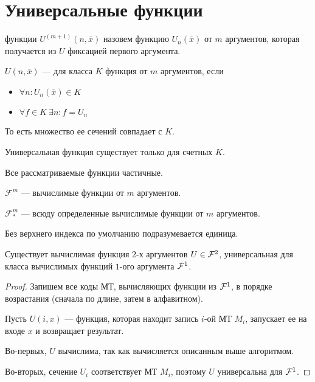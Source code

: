 \section{Универсальные функции}
\begin{defn}
	 функции $ U^{(m+1)}(n, \overline{x})$ назовем функцию $ U_n(\overline{x})$ от $ m$ аргументов, которая получается из $ U$ фиксацией первого аргумента.
\end{defn}
\begin{defn}
$ U(n, \overline{x})$ ---  для класса $ K$ функция от $ m$ аргументов, если 
	\begin{itemize}
		\item $ \forall n \colon  U_n(\overline{x}) \in K$
		\item $ \forall f \in K ~ \exists n \colon f = U_{n}$
	\end{itemize}
	То есть множество ее сечений совпадает с $ K$.
\end{defn}

\begin{note}
    Универсальная функция существует только для счетных $ K$.
\end{note}
\begin{note}
    Все рассматриваемые функции частичные.
\end{note}
\begin{name}
	$ \mathcal{F}^{m}$ --- вычислимые функции от $  m$ аргументов.

	$ \mathcal{F}^{m}_{*}$ --- всюду определенные вычислимые функции от $  m$ аргументов. 

	Без верхнего индекса по умолчанию подразумевается единица.
\end{name}

\begin{thm}\label{thm:two-args}
    Существует вычислимая функция $ 2$-х аргументов $ U \in  \mathcal{F}^2$, универсальная для класса вычислимых функций $ 1$-ого аргумента $ \mathcal{F}^{1}$.
\end{thm}
\begin{proof}
	Запишем все коды МТ, вычисляющих функции из $ \mathcal{F}^1$, в порядке возрастания (сначала по длине, затем в алфавитном).

	Пусть $ U(i, x)$ --- функция, которая находит запись $ i$-ой МТ $ M_i$, запускает ее на входе $ x$ и возвращает результат.

	Во-первых, $ U $  вычислима, так как вычисляется описанным выше алгоритмом.

	Во-вторых, сечение $ U_i$ соответствует МТ $ M_i$, поэтому $ U$ универсальна для $ \mathcal{F}^{1}$.
\end{proof}


